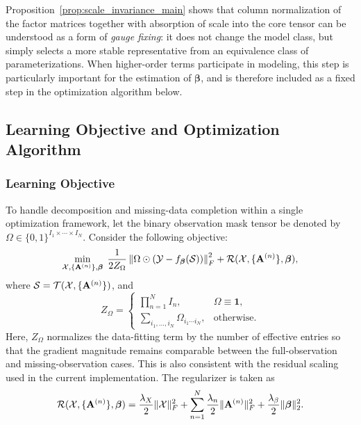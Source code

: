 Proposition~\ref{prop:scale_invariance_main} shows that column normalization of the factor matrices together with absorption of scale into the core tensor can be understood as a form of \emph{gauge fixing}: it does not change the model class, but simply selects a more stable representative from an equivalence class of parameterizations. When higher-order terms participate in modeling, this step is particularly important for the estimation of $\boldsymbol\beta$, and is therefore included as a fixed step in the optimization algorithm below.

\subsection{Learning Objective and Optimization Algorithm}

\subsubsection{Learning Objective}

To handle decomposition and missing-data completion within a single optimization framework, let the binary observation mask tensor be denoted by $\Omega\in\{0,1\}^{I_1\times\cdots\times I_N}$. Consider the following objective:
\begin{equation}
\label{eq:ntdpl_masked_objective}
\min_{\mathcal{X},\{\mathbf A^{(n)}\},\boldsymbol\beta}
\;
\frac{1}{2Z_\Omega}
\left\|
\Omega \odot
\left(
\mathcal{Y} - f_{\boldsymbol\beta}(\mathcal{S})
\right)
\right\|_F^2
+
\mathcal R(\mathcal{X},\{\mathbf A^{(n)}\},\boldsymbol\beta),
\end{equation}
where $\mathcal{S}=\mathcal{T}(\mathcal{X},\{\mathbf{A}^{(n)}\})$, and
\begin{equation}
Z_\Omega =
\begin{cases}
\prod_{n=1}^{N} I_n, & \Omega \equiv \mathbf 1,\\[2mm]
\sum\limits_{i_1,\dots,i_N} \Omega_{i_1\cdots i_N}, & \text{otherwise}.
\end{cases}
\end{equation}
Here, $Z_\Omega$ normalizes the data-fitting term by the number of effective entries so that the gradient magnitude remains comparable between the full-observation and missing-observation cases. This is also consistent with the residual scaling used in the current implementation. The regularizer is taken as
\begin{equation}
\label{eq:ntdpl_reg_obj}
\mathcal R(\mathcal{X},\{\mathbf A^{(n)}\},\boldsymbol\beta)
=
\frac{\lambda_X}{2}\|\mathcal{X}\|_F^2
+
\sum_{n=1}^{N}\frac{\lambda_n}{2}\|\mathbf A^{(n)}\|_F^2
+
\frac{\lambda_\beta}{2}\|\boldsymbol\beta\|_2^2.
\end{equation}

